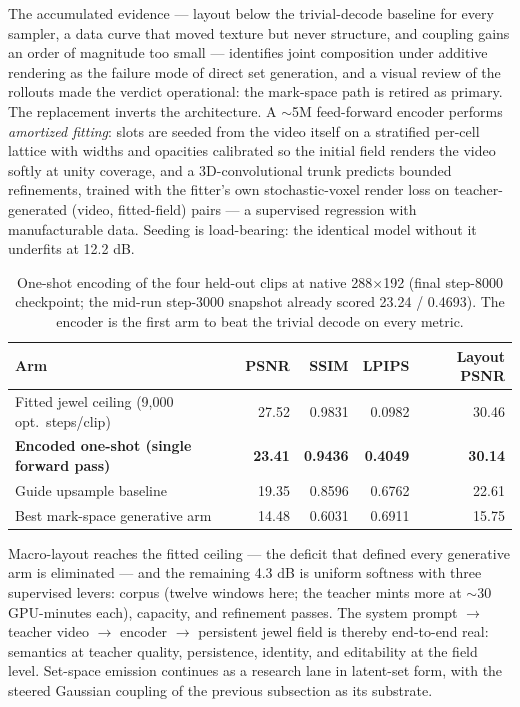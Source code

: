 \documentclass[10pt]{article}
\begin{document}
The accumulated evidence --- layout below the trivial-decode baseline for every sampler, a
data curve that moved texture but never structure, and coupling gains an order of magnitude
too small --- identifies joint composition under additive rendering as the failure mode of
direct set generation, and a visual review of the rollouts made the verdict operational: the
mark-space path is retired as primary. The replacement inverts the architecture. A $\sim$5M
feed-forward encoder performs \emph{amortized fitting}: slots are seeded from the video itself
on a stratified per-cell lattice with widths and opacities calibrated so the initial field
renders the video softly at unity coverage, and a 3D-convolutional trunk predicts bounded
refinements, trained with the fitter's own stochastic-voxel render loss on teacher-generated
(video, fitted-field) pairs --- a supervised regression with manufacturable data. Seeding is
load-bearing: the identical model without it underfits at 12.2 dB.

\begin{table}[H]
\centering
\small
\caption{One-shot encoding of the four held-out clips at native 288\(\times\)192 (final step-8000
checkpoint; the mid-run step-3000 snapshot already scored 23.24 / 0.4693). The encoder is the first arm to beat the trivial
decode on every metric.}
\label{tab:encoder}
\begin{tabular}{@{}lrrrr@{}}
\toprule
Arm & PSNR & SSIM & LPIPS & Layout PSNR \\
\midrule
Fitted jewel ceiling (9{,}000 opt.\ steps/clip) & 27.52 & 0.9831 & 0.0982 & 30.46 \\
\textbf{Encoded one-shot (single forward pass)} & \textbf{23.41} & \textbf{0.9436} & \textbf{0.4049} & \textbf{30.14} \\
Guide upsample baseline & 19.35 & 0.8596 & 0.6762 & 22.61 \\
Best mark-space generative arm & 14.48 & 0.6031 & 0.6911 & 15.75 \\
\bottomrule
\end{tabular}
\end{table}

Macro-layout reaches the fitted ceiling --- the deficit that defined every generative arm is
eliminated --- and the remaining 4.3 dB is uniform softness with three supervised levers:
corpus (twelve windows here; the teacher mints more at $\sim$30 GPU-minutes each), capacity,
and refinement passes. The system prompt \(\rightarrow\) teacher video \(\rightarrow\)
encoder \(\rightarrow\) persistent jewel field is thereby end-to-end real: semantics at
teacher quality, persistence, identity, and editability at the field level. Set-space
emission continues as a research lane in latent-set form, with the steered Gaussian coupling
of the previous subsection as its substrate.
\end{document}
